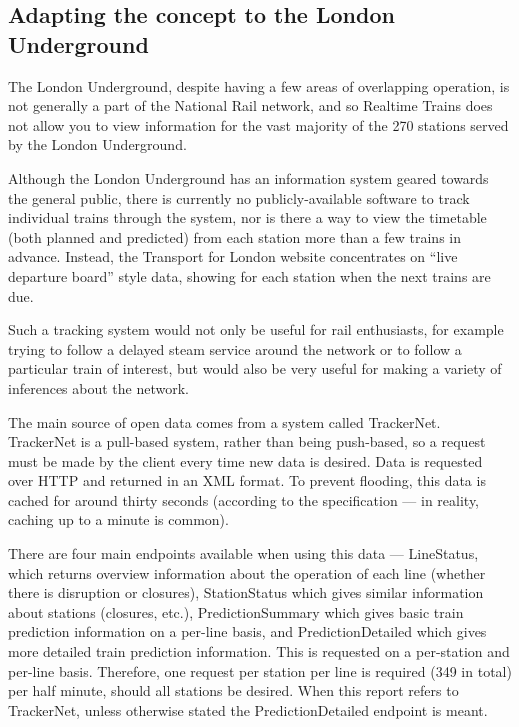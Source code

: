 \documentclass[a4paper,12pt]{article}
\begin{document}
\subsection{Adapting the concept to the London Underground}

The London Underground, despite having a few areas of overlapping operation, is
not generally a part of the National Rail network, and so Realtime Trains does
not allow you to view information for the vast majority of the 270 stations
served by the London Underground.

Although the London Underground has an information system geared towards the
general public, there is currently no publicly-available software to track
individual trains through the system, nor is there a way to view the timetable
(both planned and predicted) from each station more than a few trains in
advance. Instead, the Transport for London website concentrates on ``live
departure board'' style data, showing for each station when the next trains are
due.

Such a tracking system would not only be useful for rail enthusiasts, for
example trying to follow a delayed steam service around the network or to
follow a particular train of interest, but would also be very useful for making
a variety of inferences about the network.

The main source of open data comes from a system called TrackerNet. TrackerNet
is a pull-based system, rather than being push-based, so a request must be made
by the client every time new data is desired. Data is requested over HTTP and
returned in an XML format. To prevent flooding, this data is cached for around
thirty seconds (according to the specification --- in reality, caching up to a
minute is common).

There are four main endpoints available when using this data --- LineStatus,
which returns overview information about the operation of each line (whether
there is disruption or closures), StationStatus which gives similar information
about stations (closures, etc.), PredictionSummary which gives basic train
prediction information on a per-line basis, and PredictionDetailed which gives
more detailed train prediction information. This is requested on a per-station
and per-line basis\cite{TrackerNetSpec}. Therefore, one request per station per
line is required (349 in total) per half minute, should all stations be
desired. When this report refers to TrackerNet, unless otherwise stated the
PredictionDetailed endpoint is meant.
\end{document}
